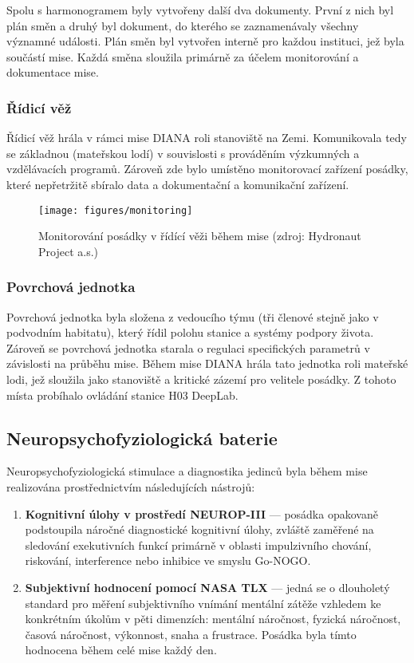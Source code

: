Spolu s harmonogramem byly vytvořeny další dva dokumenty. První z nich byl plán
směn a druhý byl dokument, do kterého se zaznamenávaly všechny významné
události. Plán směn byl vytvořen interně pro každou instituci, jež byla součástí
mise. Každá směna sloužila primárně za účelem monitorování a dokumentace mise.

\subsubsection{Řídicí věž}
\label{subsubsec:ridici_vez}
Řídicí věž hrála v rámci mise DIANA roli stanoviště na Zemi. Komunikovala tedy
se základnou (mateřskou lodí) v souvislosti s prováděním výzkumných a
vzdělávacích programů. Zároveň zde bylo umístěno monitorovací zařízení posádky,
které nepřetržitě sbíralo data a dokumentační a komunikační zařízení.

\begin{figure}[h]
    \begin{center}
        \texttt{[image: figures/monitoring]}
        \caption{Monitorování posádky v řídící věži během mise (zdroj: Hydronaut Project a.s.)}
        \label{fig:monitoring}
    \end{center}
\end{figure}

\subsubsection{Povrchová jednotka}
\label{subsubsec:povrchova_jednotka}
Povrchová jednotka byla složena z vedoucího týmu (tři členové stejně jako v
podvodním habitatu), který řídil polohu stanice a systémy podpory života.
Zároveň se povrchová jednotka starala o regulaci specifických parametrů v
závislosti na průběhu mise. Během mise DIANA hrála tato jednotka roli mateřské
lodi, jež sloužila jako stanoviště a kritické zázemí pro velitele posádky. Z
tohoto místa probíhalo ovládání stanice H03 DeepLab.

\subsection{Neuropsychofyziologická baterie}
\label{subsubsec:neuro_testy}
Neuropsychofyziologická stimulace a diagnostika jedinců byla během mise
realizována prostřednictvím následujících nástrojů:
\begin{enumerate}
    \item \textbf{Kognitivní úlohy v prostředí NEUROP-III} --- posádka opakovaně
          podstoupila náročné diagnostické kognitivní úlohy, zvláště zaměřené na
          sledování exekutivních funkcí primárně v oblasti impulzivního chování,
          riskování, interference nebo inhibice ve smyslu Go-NOGO.
    \item \textbf{Subjektivní hodnocení pomocí NASA TLX} --- jedná se o
          dlouholetý standard pro měření subjektivního vnímání mentální zátěže
          vzhledem ke konkrétním úkolům v pěti dimenzích: mentální náročnost, fyzická
          náročnost, časová náročnost, výkonnost, snaha a frustrace. Posádka byla
          tímto hodnocena během celé mise každý den.
\end{enumerate}

